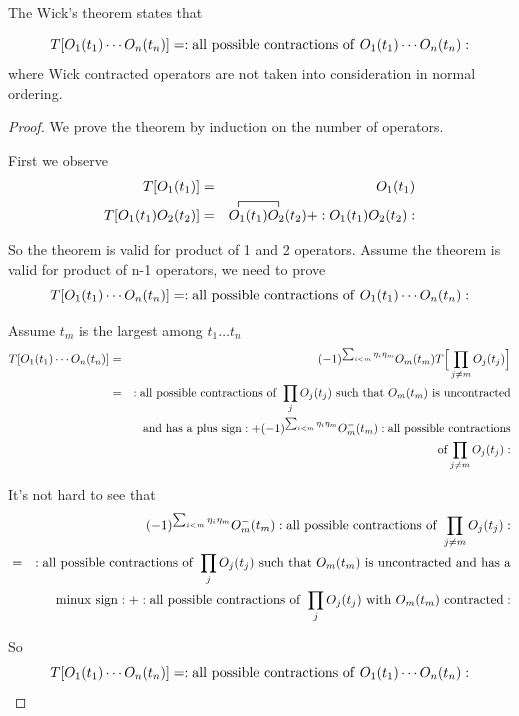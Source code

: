 \documentclass[12pt]{book}
\begin{document}
	The Wick's theorem states that
	\begin{theorem}[Wick]
		\begin{equation}
			T[O_1(t_1)\cdots O_n(t_n)]=:{\rm all\ possible\ contractions\ of\ }O_1(t_1)\cdots O_n(t_n):
		\end{equation}
		where Wick contracted operators are not taken into consideration in normal ordering.
	\end{theorem}
	\begin{proof}
		We prove the theorem by induction on the number of operators. 
		
		First we observe
		\begin{eqnarray}
			T[O_1(t_1)]&=&O_1(t_1)\\
			\contraction{T[O_1(t_1)O_2(t_2)]=\quad}{O}{{}_1(t_1)}{O}
			T[O_1(t_1)O_2(t_2)]&=&O_1(t_1)O_2(t_2)+:O_1(t_1)O_2(t_2):\\
		\end{eqnarray}
		
		So the theorem is valid for product of 1 and 2 operators. Assume the theorem is valid for product of n-1 operators, we need to prove
		\begin{equation}
			T[O_1(t_1)\cdots O_n(t_n)]=:{\rm all\ possible\ contractions\ of\ }O_1(t_1)\cdots O_n(t_n):
		\end{equation}
		
		Assume $t_m$ is the largest among $t_1\dots t_n$
		\begin{eqnarray}
			T[O_1(t_1)\cdots O_n(t_n)]
			&=&(-1)^{\sum_{i<m}\eta_i\eta_m} O_m(t_m)T\Big[\prod_{j\neq m}O_j(t_j)\Big]\\
			&=&:{\rm all\ possible\ contractions\ of\ }\prod_{j}O_j(t_j){\rm\ such \ that\ }O_m(t_m){\rm\ is \ uncontracted}\nonumber \\
			&&{\rm and\ has\ a\ plus\ sign}:+(-1)^{\sum_{i<m}\eta_i\eta_m} O^-_m(t_m):{\rm all\ possible\ contractions}\nonumber \\
			&&{\rm of}\prod_{j\neq m}O_j(t_j):
		\end{eqnarray}
		
		It's not hard to see that
		\begin{eqnarray}
			&&(-1)^{\sum_{i<m}\eta_i\eta_m} O^-_m(t_m):{\rm all\ possible\ contractions\ of\ }\prod_{j\neq m}O_j(t_j):\\
			&=&:{\rm all\ possible\ contractions\ of\ }\prod_{j}O_j(t_j){\rm\ such\ that\ }O_m(t_m){\rm\ is \ uncontracted\ and\ has\ a}\nonumber \\
			&&{\rm minux\ sign}:+:{\rm all\ possible\ contractions\ of\ }\prod_{j}O_j(t_j){\rm\ with\ }O_m(t_m){\rm \ contracted}:
		\end{eqnarray}
		
		So 
		\begin{equation}
			T[O_1(t_1)\cdots O_n(t_n)]=:{\rm all\ possible\ contractions\ of\ }O_1(t_1)\cdots O_n(t_n):
		\end{equation}
	\end{proof}
	
\end{document}
